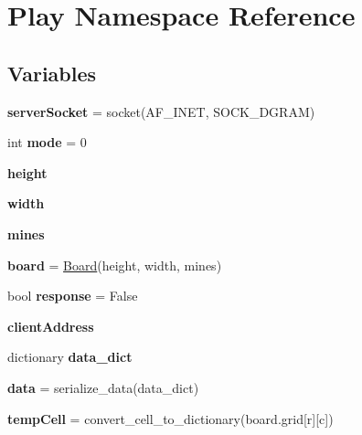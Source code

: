 \hypertarget{namespace_play}{}\section{Play Namespace Reference}
\label{namespace_play}
\subsection*{Variables}
\begin{DoxyCompactItemize}
\item 
\mbox{\label{namespace_play_a044632b9bf77f16d1a9df2bc81ac3129}} 
{\bfseries server\+Socket} = socket(A\+F\+\_\+\+I\+N\+ET, S\+O\+C\+K\+\_\+\+D\+G\+R\+AM)
\item 
\mbox{\label{namespace_play_abd2359e94b8e42299015d8b0178b3c3f}} 
int {\bfseries mode} = 0
\item 
\mbox{\label{namespace_play_a3f79c67aec3aac567a1daaf8fe775e87}} 
{\bfseries height}
\item 
\mbox{\label{namespace_play_a26e3b56f122ba00b48e1a88583f66f3f}} 
{\bfseries width}
\item 
\mbox{\label{namespace_play_a6b2134f21cedd95a4c45d49d9dd17504}} 
{\bfseries mines}
\item 
\mbox{\label{namespace_play_afe04e19157c75be4cc5f72f41a9858f8}} 
{\bfseries board} = \hyperlink{class_board_1_1_board}{Board}(height, width, mines)
\item 
\mbox{\label{namespace_play_a7cfeb37a7d66635f5793f535339a60b2}} 
bool {\bfseries response} = False
\item 
\mbox{\label{namespace_play_af5bbed7c9573b88eab860a56ac570474}} 
{\bfseries client\+Address}
\item 
dictionary {\bfseries data\+\_\+dict}
\item 
\mbox{\label{namespace_play_a6b40175c41f6e2ef9328ec58b717c459}} 
{\bfseries data} = serialize\+\_\+data(data\+\_\+dict)
\item 
\mbox{\label{namespace_play_a6403484a1168ac57194db75e6bd79fe2}} 
{\bfseries temp\+Cell} = convert\+\_\+cell\+\_\+to\+\_\+dictionary(board.\+grid\mbox{[}r\mbox{]}\mbox{[}c\mbox{]})
\end{DoxyCompactItemize}


